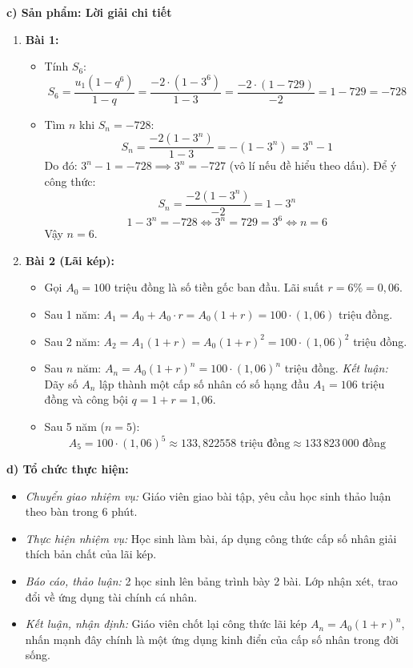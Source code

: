 \documentclass[12pt, a4paper]{article}
\begin{document}
\noindent \textbf{c) Sản phẩm: Lời giải chi tiết}
\begin{enumerate}[leftmargin=0.6cm]
    \item \textbf{Bài 1:}
    \begin{itemize}
        \item Tính $S_6$:
        $$S_6 = \dfrac{u_1(1 - q^6)}{1 - q} = \dfrac{-2 \cdot (1 - 3^6)}{1 - 3} = \dfrac{-2 \cdot (1 - 729)}{-2} = 1 - 729 = -728$$
        \item Tìm $n$ khi $S_n = -728$:
        $$S_n = \dfrac{-2(1 - 3^n)}{1 - 3} = -(1 - 3^n) = 3^n - 1$$
        Do đó: $3^n - 1 = -728 \implies 3^n = -727$ (vô lí nếu đề hiểu theo dấu). Để ý công thức:
        $$S_n = \dfrac{-2(1 - 3^n)}{-2} = 1 - 3^n$$
        $$1 - 3^n = -728 \iff 3^n = 729 = 3^6 \iff n = 6$$
        Vậy $n = 6$.
    \end{itemize}
    \item \textbf{Bài 2 (Lãi kép):}
    \begin{itemize}
        \item Gọi $A_0 = 100$ triệu đồng là số tiền gốc ban đầu. Lãi suất $r = 6\% = 0{,}06$.
        \item Sau 1 năm: $A_1 = A_0 + A_0 \cdot r = A_0(1 + r) = 100 \cdot (1{,}06)$ triệu đồng.
        \item Sau 2 năm: $A_2 = A_1(1 + r) = A_0(1 + r)^2 = 100 \cdot (1{,}06)^2$ triệu đồng.
        \item Sau $n$ năm: $A_n = A_0(1 + r)^n = 100 \cdot (1{,}06)^n$ triệu đồng.
        \textit{Kết luận:} Dãy số $A_n$ lập thành một cấp số nhân có số hạng đầu $A_1 = 106$ triệu đồng và công bội $q = 1 + r = 1{,}06$.
        \item Sau 5 năm ($n = 5$):
        $$A_5 = 100 \cdot (1{,}06)^5 \approx 133{,}822558\text{ triệu đồng} \approx 133\,823\,000\text{ đồng}$$
    \end{itemize}
\end{enumerate}

\noindent \textbf{d) Tổ chức thực hiện:}
\begin{itemize}[leftmargin=0.8cm]
    \item \textit{Chuyển giao nhiệm vụ:} Giáo viên giao bài tập, yêu cầu học sinh thảo luận theo bàn trong 6 phút.
    \item \textit{Thực hiện nhiệm vụ:} Học sinh làm bài, áp dụng công thức cấp số nhân giải thích bản chất của lãi kép.
    \item \textit{Báo cáo, thảo luận:} 2 học sinh lên bảng trình bày 2 bài. Lớp nhận xét, trao đổi về ứng dụng tài chính cá nhân.
    \item \textit{Kết luận, nhận định:} Giáo viên chốt lại công thức lãi kép $A_n = A_0(1+r)^n$, nhấn mạnh đây chính là một ứng dụng kinh điển của cấp số nhân trong đời sống.
\end{itemize}
\end{document}

